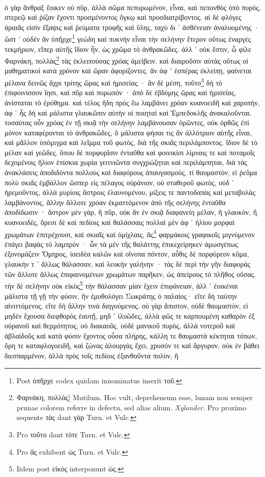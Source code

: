 \documentclass[a4paper, 11pt, oneside, polutonikogreek, german]{article}
\begin{document}
\paragraph{}
ὁ γὰρ ἄνθραξ ἔοικεν οὐ πῦρ, ἀλλὰ σῶμα πεπυρωμένον, εἶναι, καὶ πεπονθὸς ὑπὸ πυρὸς, στερεῷ καὶ ῥίζαν ἔχοντι προσμένοντος ὄγκῳ καὶ προσδιατρίβοντος. αἱ δὲ φλόγες ἀραιᾶς εἰσὶν ἔξαψις καὶ ῥεύματα τροφῆς καὶ ὕλης, ταχὺ δι ᾽ ἀσθένειαν ἀναλυομένης · ὥστ ᾽ οὐδὲν ἂν ὑπῆρχε\footnote{Post ὑπῆρχε codex quidam innominatus inserit τοῦ.} γεώδη καὶ πυκνὴν εἶναι τὴν σελήνην ἕτερον οὕτως ἐναργὲς τεκμήριον, εἴπερ αὐτῆς ἴδιον ἦν, ὡς χρῶμα τὸ ἀνθρακῶδες. ἀλλ ᾽ οὐκ ἔστιν, ὦ φίλε Φαρνάκη, πολλὰς\footnote{Φαρνάκη, πολλὰς] Mutilum. Hoc vult, deprehensum esse, lunam non semper prunae colorem referre in defectu, sed alias alium. \emph{Xylander.} Pro proximo sequente τὰς dant γὰρ Turn. et Vulc.} τὰς ἐκλειπούσας χρόας ἀμείβειν. καὶ διαιροῦσιν αὐτὰς οὕτως οἱ μαθηματικοὶ κατὰ χρόνον καὶ ὥραν ἀφορίζοντες. ἂν ἀφ ᾽ ἑσπέρας ἐκλείπῃ, φαίνεται μέλανα δεινῶς ἄχρι τρίτης ὥρας καὶ ἡμισείας · ἂν δὲ μέση, τοῦτο\footnote{Pro τοῦτο dant τότε Turn. et Vulc.} δὴ τὸ ἐπιφοινίσσον ἵησι, καὶ πῦρ καὶ πυρωπόν · ἀπὸ δὲ ἑβδόμης ὥρας καὶ ἡμισείας, ἀνίσταται τὸ ἐρύθημα. καὶ τέλος ἤδη πρὸς ἕω λαμβάνει χρόαν κυανοειδῆ καὶ χαροπὴν, ἀφ ᾽ ἧς δὴ καὶ μάλιστα γλαυκῶπιν αὐτὴν οἱ ποιηταὶ καὶ Ἐμπεδοκλῆς ἀνακαλοῦνται. τοσαύτας οὖν χρόας ἐν τῇ σκιᾷ τὴν σελήνην λαμβάνουσαν ὁρῶντες, οὐκ ὀρθῶς ἐπὶ μόνον καταφέρονται τὸ ἀνθρακῶδες, ὃ μάλιστα φήσαι τις ἂν ἀλλότριον αὐτῆς εἶναι, καὶ μᾶλλον ὑπόμιγμα καὶ λεῖμμα τοῦ φωτὸς, διὰ τῆς σκιᾶς περιλάμποντος. ἴδιον δὲ τὸ μέλαν καὶ γεῶδες. ὅπου δὲ πορφυρἴσιν ἐνταῦθα καὶ φοινικίσι λίμναις τε καὶ ποταμοῖς δεχομένοις ἥλιον ἐπίσκια χωρία γειτνιῶντα συγχρώζηται καὶ περιλάμπηται, διὰ τὰς ἀνακλάσεις ἀποδιδόντα πολλοὺς καὶ διαφόρους ἀπαυγασμοὺς, τί θαυμαστὸν, εἰ ῥεῦμα πολὺ σκιᾶς ἐμβάλλον ὥσπερ εἰς πέλαγος οὐράνιον, οὐ σταθεροῦ φωτὸς, οὐδ ᾽ ἠρεμοῦντος, ἀλλὰ μυρίοις ἄστροις ἐλαυνομένου, μίξεις τε παντοδαπὰς καὶ μεταβολὰς λαμβάνοντος, ἄλλην ἄλλοτε χρόαν ἐκματτόμενον ἀπὸ τῆς σελήνης ἐνταῦθα ἀποδίδωσιν · ἄστρον μὲν γὰρ, ἢ πῦρ, οὐκ ἂν ἐν σκιᾷ διαφανείη μέλαν, ἢ γλαυκὸν, ἢ κυανοειδὲς, ὄρεσι δὲ καὶ πεδίοις καὶ θαλάσσαις πολλαὶ μὲν ἀφ ᾽ ἡλίου μορφαὶ χρωμάτων ἐπιτρέχουσι, καὶ σκιαῖς καὶ ὁμίχλαις, ἃς\footnote{Pro ἃς exhibent ὡς Turn. et Vulc.} φαρμάκοις γραφικοῖς μιγνύμενον ἐπάγει βαφὰς τὸ λαμπρόν · ὧν τὰ μὲν τῆς θαλάττης ἐπικεχείρηκεν ἀμωσγέπως ἐξονομάζειν Ὅμηρος, ἰοειδέα καλῶν καὶ οἴνοπα πόντον, αὖθις δὲ πορφύρεον κῦμα, γλαυκήν τ ᾽ ἄλλως θάλασσαν, καὶ λευκὴν γαλήνην · τὰς δὲ περὶ τὴν γῆν διαφορὰς τῶν ἄλλοτε ἄλλως ἐπιφαινομένων χρωμάτων παρῆκεν, ὡς ἀπείρους τὸ πλῆθος οὔσας. τὴν δὲ σελήνην οὐκ εἰκὸς\footnote{Iidem post εἰκὸς interponunt ὡς.} τὴν θάλασσαν μίαν ἔχειν ἐπιφάνειαν, ἀλλ ᾽ ἐοικέναι μάλιστα τῇ γῇ τὴν φύσιν, ἣν ἐμυθολόγει Σωκράτης ὁ παλαίος· εἴτε δὴ ταύτην αἰνιττόμενος, εἴτε δὴ ἄλλην τινὰ διηγούμενος. οὐ γὰρ ἄπιστον, οὐδὲ θαυμαστὸν, εἰ μηδὲν ἔχουσα διεφθορὸς ἑαυτῇ, μηδ ᾽ ἰλυῶδες, ἀλλὰ φῶς τε καρπουμένη καθαρὸν ἐξ οὐρανοῦ καὶ θερμότητος, οὐ διακαοῦς, οὐδὲ μανικοῦ πυρὸς, ἀλλὰ νοτεροῦ καὶ ἀβλαίδοῦς καὶ κατὰ φύσιν ἔχοντος οὖσα πλήρης, κάλλη τε θαυμαστὰ κέκτηται τόπων, ὄρη τε καταφλογοειδῆ, καὶ ζώνας ἁλουργὰς ἔχει, χρυσόν τε καὶ ἄργυρον, οὐκ ἐν βάθει διεσπαρμένον, ἀλλὰ πρὸς τοῖς πεδίοις ἐξανθοῦντα πολὺν, ἢ 
\end{document}
